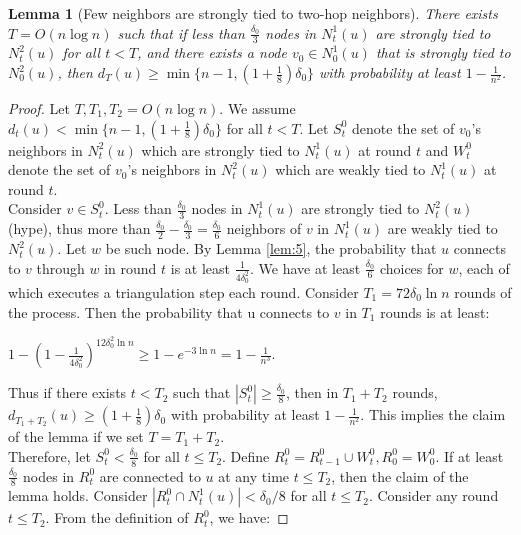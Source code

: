 \documentclass[
10pt, %
a4paper, %
oneside, %
headinclude,footinclude, %
BCOR5mm, %
]{scrartcl}
\newtheorem{lemma}[theorem]{\textbf{Lemma}}
\begin{document}
\begin{lemma}[Few neighbors are strongly tied to two-hop neighbors]\label{lem:7}
	There exists $T = O(n\log n)$ such that if less than $\frac{\delta_0}{3}$ nodes in $N_t^1(u)$ are strongly tied to $N_t^2(u)$ for all $t < T$, and there exists a node $v_0 \in N_0^1(u)$ that is strongly tied to $N_0^2(u)$, then $d_T(u) \geq \min \{n-1, (1+\frac{1}{8})\delta_0 \}$ with probability at least $ 1 - \frac{1}{n^2}$.
\end{lemma}
\begin{proof}
	Let $T, T_1, T_2 = O(n\log n)$. We assume $d_t(u) < \min \{n-1, (1+\frac{1}{8})\delta_0 \}$ for all $t < T$. Let $S_t^0$ denote the set of $v_0$'s neighbors in $N_t^2(u)$ which are strongly tied to $N_t^1(u)$ at round $t$ and $W_t^0$ denote the set of $v_0$'s neighbors in $N_t^2(u)$ which are weakly tied to $N_t^1(u)$ at round $t$.\\
	Consider $v \in S_t^0$. Less than $\frac{\delta_0}{3}$ nodes in $N_t^1(u)$ are strongly tied to $N_t^2(u)$ (hype), thus more than $\frac{\delta_0}{2} - \frac{\delta_0}{3} = \frac{\delta_0}{6}$ neighbors of $v$ in $N_t^1(u)$ are weakly tied to $N_t^2(u)$. Let $w$ be such node. By Lemma \ref{lem:5}, the probability that $u$ connects to $v$ through $w$ in round $t$ is at least $\frac{1}{4\delta_0^2}$. We have at least $\frac{\delta_0}{6}$ choices for $w$, each of which executes a triangulation step each round. Consider $T_1 = 72\delta_0\ln n$ rounds of the process. Then the probability that u connects to $v$  in $T_1$ rounds is at least:
	\begin{center}
		\begin{math}
		1 - (1 - \frac{1}{4\delta_0^2}) ^{12\delta_0^2\ln n} \geq
		1 - e^{-3\ln n} = 1 - \frac{1}{n^3}.
		\end{math}
	\end{center}
	Thus if there exists $t < T_2$ such that $|S_t^0| \geq \frac{\delta_0}{8}$, then in $T_1 + T_2$ rounds, $d_{T_1 + T_2}(u) \geq (1 + \frac{1}{8}) \delta_0$ with probability at least $1 - \frac{1}{n^2}$. This implies the claim of the lemma if we set $T = T_1 + T_2$.\\
	Therefore, let $S_t^0 < \frac{\delta_0}{8}$ for all $t \leq T_2$. Define $R_t^0 = R_{t-1}^0 \cup W_t^0, R_0^0 = W_0^0$. If at least $\frac{\delta_0}{8}$ nodes in $R_t^0$ are connected to $u$ at any time $t \leq T_2$, then the claim of the lemma holds. Consider $|R_t^0 \cap N_t^1(u)| < \delta_0 / 8$ for all $ t \leq T_2$. Consider any round $t \leq T_2$. From the definition of $R_t^0$, we have:

\end{proof}
\end{document}
